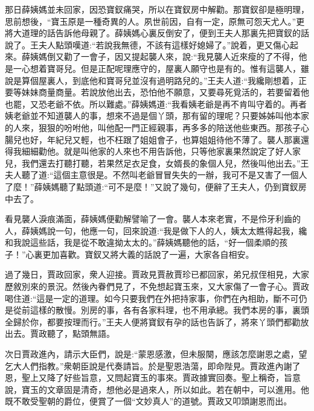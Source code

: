 \begin{parag}
    那日薛姨媽並未回家，因恐寶釵痛哭，所以在寶釵房中解勸。那寶釵卻是極明理，思前想後，“寶玉原是一種奇異的人。夙世前因，自有一定，原無可怨天尤人。”更將大道理的話告訴他母親了。薛姨媽心裏反倒安了，便到王夫人那裏先把寶釵的話說了。王夫人點頭嘆道:“若說我無德，不該有這樣好媳婦了。”說着，更又傷心起來。薛姨媽倒又勸了一會子，因又提起襲人來，說:“我見襲人近來瘦的了不得，他是一心想着寶哥兒。但是正配呢理應守的，屋裏人願守也是有的。惟有這襲人，雖說是算個屋裏人，到底他和寶哥兒並沒有過明路兒的。”王夫人道:“我纔剛想着，正要等妹妹商量商量。若說放他出去，恐怕他不願意，又要尋死覓活的，若要留着他也罷，又恐老爺不依。所以難處。”薛姨媽道:“我看姨老爺是再不肯叫守着的。再者姨老爺並不知道襲人的事，想來不過是個丫頭，那有留的理呢？只要姊姊叫他本家的人來，狠狠的吩咐他，叫他配一門正經親事，再多多的陪送他些東西。那孩子心腸兒也好，年紀兒又輕，也不枉跟了姐姐會子，也算姐姐待他不薄了。襲人那裏還得我細細勸他。就是叫他家的人來也不用告訴他，只等他家裏果然說定了好人家兒，我們還去打聽打聽，若果然足衣足食，女婿長的象個人兒，然後叫他出去。”王夫人聽了道:“這個主意很是。不然叫老爺冒冒失失的一辦，我可不是又害了一個人了麼！”薛姨媽聽了點頭道:“可不是麼！”又說了幾句，便辭了王夫人，仍到寶釵房中去了。
\end{parag}


\begin{parag}
    看見襲人淚痕滿面，薛姨媽便勸解譬喻了一會。襲人本來老實，不是伶牙利齒的人，薛姨媽說一句，他應一句，回來說道:“我是做下人的人，姨太太瞧得起我，纔和我說這些話，我是從不敢違拗太太的。”薛姨媽聽他的話，“好一個柔順的孩子！”心裏更加喜歡。寶釵又將大義的話說了一遍，大家各自相安。
\end{parag}


\begin{parag}
    過了幾日，賈政回家，衆人迎接。賈政見賈赦賈珍已都回家，弟兄叔侄相見，大家歷敘別來的景況。然後內眷們見了，不免想起寶玉來，又大家傷了一會子心。賈政喝住道:“這是一定的道理。如今只要我們在外把持家事，你們在內相助，斷不可仍是從前這樣的散慢。別房的事，各有各家料理，也不用承總。我們本房的事，裏頭全歸於你，都要按理而行。”王夫人便將寶釵有孕的話也告訴了，將來丫頭們都勸放出去。賈政聽了，點頭無語。
\end{parag}


\begin{parag}
    次日賈政進內，請示大臣們，說是:“蒙恩感激，但未服闋，應該怎麼謝恩之處，望乞大人們指教。”衆朝臣說是代奏請旨。於是聖恩浩蕩，即命陛見。賈政進內謝了恩，聖上又降了好些旨意，又問起寶玉的事來。賈政據實回奏。聖上稱奇，旨意說，寶玉的文章固是清奇，想他必是過來人，所以如此。若在朝中，可以進用。他既不敢受聖朝的爵位，便賞了一個“文妙真人”的道號。賈政又叩頭謝恩而出。
\end{parag}


